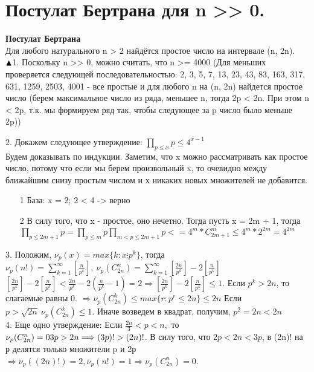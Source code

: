 \setcounter{section}{89}
\section{Постулат Бертрана для n >> 0.}

\textbf{Постулат Бертрана}\\
Для любого натурального n > 2 найдётся простое число на интервале (n, 2n).\\
$\blacktriangle \ \\$1. Поскольку n >> 0, можно считать, что n >= 4000 (Для меньших проверяется следующей последовательностью: 2, 3, 5, 7, 13, 23, 43, 83, 163, 317, 631, 1259, 2503, 4001 - все простые и для любого n на (n, 2n) найдется простое число (берем максимальное число из ряда, меньшее n, тогда 2p < 2n. При этом n < 2p, т.к. мы формируем ряд так, чтобы следующее за p число было меньше 2p))

2.  Докажем следующее утверждение: $\prod\limits_{p \leq x}p \leq 4^{x-1}$\\ Будем доказывать по индукции. Заметим, что x можно рассматривать как простое число, потому что если мы берем произвольный x, то очевидно между ближайшим снизу простым числом и х никаких новых множителей не добавится.
\begin{itemize}
    \item[1] База: x = 2; 2 < 4 -> верно
    \item[2] В силу того, что x - простое, оно нечетно. Тогда пусть x = 2m + 1, тогда $\prod\limits_{p \leq 2m+1}p = \prod\limits_{p \leq m}p \prod\limits_{m < p\leq 2m+1}p <= 4^m * C_{2m+1}^m \leq  4^m *2^{2m} = 4^{2m}$
\end{itemize}

3. Положим, $\nu_p(x) = max\{k: x \vdots p^k\}$, тогда $\nu_p(n!) = \sum\limits_{k = 1}^{\infty}[\frac{n}{p^k}], \ \nu_p(C_{2n}^n) = \sum\limits_{k = 1}^{\infty}[\frac{2n}{p^k}] - 2[\frac{n}{p^k}]$
$[\frac{2n}{p^k}] - 2[\frac{n}{p^k}] < \frac{2n}{p^k} - 2(\frac{n}{p^k} - 1) = 2 \Longrightarrow  [\frac{2n}{p^k}] - 2[\frac{n}{p^k}] \leq 1 $. Если $p^k > 2n$, то слагаемые равны 0. $\Longrightarrow \nu_p(C_{2n}^k) \leq max\{r: p^r \leq 2n\} \leq 2n$ Если $p > \sqrt{2n} \ \nu_p(C_{2n}^k) \leq 1$. Иначе возведем в квадрат, получим, $p^2 = 2n < 2n$\\

4. Еще одно утверждение: Если $\frac{2n}{3} < p < n,$ то $\nu_p(C_{2n}^n) = 0 \\ 3p > 2n \Longrightarrow (3p)! > (2n)!$. 
В силу того, что $2p < 2n < 3p$, в (2n)! на р делятся только множители p и 2р $\Longrightarrow \nu_p((2n)!) = 2, \nu_p(n!) = 1 \Longrightarrow \nu_p(C_{2n}^n) = 0 $.


